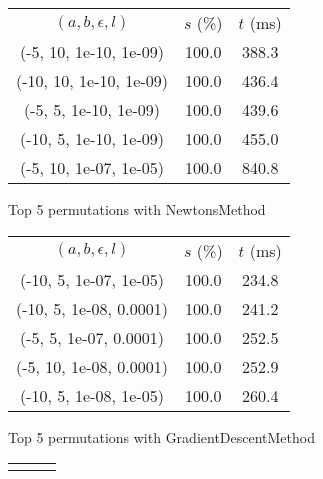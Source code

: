 \begin{figure}[H]
\label{fig:param_comp_MatrixSquareSum_DichotomousSearch}
\begin{subfigure}[ht]{.5\textwidth}
\begin{tabular}{|c|c|c|}
\hline
\rowcolor{gray!25}
\multicolumn{3}{|c|}{NewtonsMethod} \\
\hline
\rowcolor{gray!25}
$(a,b,\epsilon,l)$ & $s$ (\%) & $t$ (ms) \\
\hline
(-5, 10, 1e-10, 1e-09) & 100.0 & 388.3 \\
(-10, 10, 1e-10, 1e-09) & 100.0 & 436.4 \\
(-5, 5, 1e-10, 1e-09) & 100.0 & 439.6 \\
(-10, 5, 1e-10, 1e-09) & 100.0 & 455.0 \\
(-5, 10, 1e-07, 1e-05) & 100.0 & 840.8 \\
\hline
\end{tabular}
\caption{Top 5 permutations with NewtonsMethod}
\label{subfig:param_comp_MatrixSquareSum_NewtonsMethod_DichotomousSearch}
\end{subfigure}
\hfill
\begin{subfigure}[ht]{.5\textwidth}
\begin{tabular}{|c|c|c|}
\hline
\rowcolor{gray!25}
\multicolumn{3}{|c|}{GradientDescentMethod} \\
\hline
\rowcolor{gray!25}
$(a,b,\epsilon,l)$ & $s$ (\%) & $t$ (ms) \\
\hline
(-10, 5, 1e-07, 1e-05) & 100.0 & 234.8 \\
(-10, 5, 1e-08, 0.0001) & 100.0 & 241.2 \\
(-5, 5, 1e-07, 0.0001) & 100.0 & 252.5 \\
(-5, 10, 1e-08, 0.0001) & 100.0 & 252.9 \\
(-10, 5, 1e-08, 1e-05) & 100.0 & 260.4 \\
\hline
\end{tabular}
\caption{Top 5 permutations with GradientDescentMethod}
\label{subfig:param_comp_MatrixSquareSum_GradientDescentMethod_DichotomousSearch}
\end{subfigure}
\hfill
\begin{subfigure}[ht]{.5\textwidth}
\begin{tabular}{|c|c|c|}
\hline
\rowcolor{gray!25}
\multicolumn{3}{|c|}{ConjugateGradientMethod} \\

\end{tabular}
\end{subfigure}
\end{figure}
